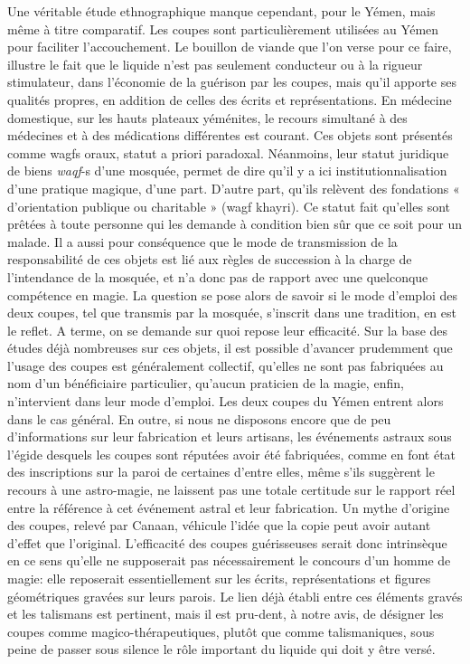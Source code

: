 Une véritable étude ethnographique manque cependant, pour le Yémen, mais même à titre comparatif. Les coupes sont particulièrement utilisées au Yémen pour faciliter l'accouchement. Le bouillon de viande que l'on verse pour ce faire, illustre le fait que le liquide n'est pas seulement conducteur ou à la rigueur stimulateur, dans l'économie de la guérison par les coupes, mais qu'il apporte ses qualités propres, en addition de celles des écrits et représentations. En médecine domestique, sur les hauts plateaux yéménites, le recours simultané à des médecines et à des médications différentes est courant. Ces objets sont présentés comme wagfs oraux, statut a priori paradoxal. Néanmoins, leur statut juridique de biens \textit{waqf}-s d'une mosquée, permet de dire qu'il y a ici institutionnalisation d'une pratique magique, d'une part. D'autre part, qu'ils relèvent des fondations « d'orientation publique ou charitable » (wagf khayri). Ce statut fait qu'elles sont prêtées à toute personne qui les demande à condition bien sûr que ce soit pour un malade. Il a aussi pour conséquence que le mode de transmission de la responsabilité de ces objets est lié aux règles de succession à la charge de l'intendance de la mosquée, et n'a donc pas de rapport avec une quelconque compétence en magie. La question se pose alors de savoir si le mode d'emploi des deux coupes, tel que transmis par la mosquée, s'inscrit dans une tradition, en est le reflet. A terme, on se demande sur quoi repose leur efficacité. Sur la base des études déjà nombreuses sur ces objets, il est possible d'avancer prudemment que l'usage des coupes est généralement collectif, qu'elles ne sont pas fabriquées au nom d'un bénéficiaire particulier, qu'aucun praticien de la magie, enfin, n'intervient dans leur mode d'emploi. Les deux coupes du Yémen entrent alors dans le cas général. En outre, si nous ne disposons encore que de peu d'informations sur leur fabrication et leurs artisans, les événements astraux sous l'égide desquels les coupes sont réputées avoir été fabriquées, comme en font état des inscriptions sur la paroi de certaines d'entre elles, même s'ils suggèrent le recours à une astro-magie, ne laissent pas une totale certitude sur le rapport réel entre la référence à cet événement astral et leur fabrication. Un mythe d'origine des coupes, relevé par Canaan, véhicule l'idée que la copie peut avoir autant d'effet que l'original. L'efficacité des coupes guérisseuses serait donc intrinsèque en ce sens qu'elle ne supposerait pas nécessairement le concours d'un homme de magie: elle reposerait essentiellement sur les écrits, représentations et figures géométriques gravées sur leurs parois. Le lien déjà établi entre ces éléments gravés et les talismans est pertinent, mais il est pru-dent, à notre avis, de désigner les coupes comme magico-thérapeutiques, plutôt que comme talismaniques, sous peine de passer sous silence le rôle important du liquide qui doit y être versé.

